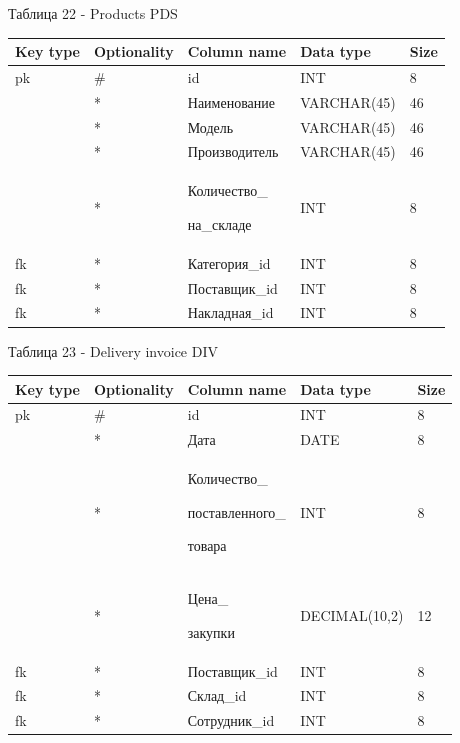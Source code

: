 \documentclass[14pt]{extreport}
\begin{document}
\newpage

\noindent
Таблица 22 - Products PDS
\begin{center}
\begin{longtable}{ |m{1.3cm}|m{2.7cm}|m{4.5cm}|m{3.5cm}|m{1.8cm}| } 
 \hline
 Key type & Optionality & Column name & Data type & Size \\ [0.5ex] 
 \hline\hline
 pk & \# & id & INT & 8 \\
 \hline
  & * & Наименование & VARCHAR(45) & 46 \\
 \hline
  & * & Модель & VARCHAR(45) & 46 \\
 \hline
  & * & Производитель & VARCHAR(45) & 46 \\
 \hline
  & * & Количество\_
 
 на\_складе & INT & 8 \\
 \hline
 fk & * & Категория\_id & INT & 8 \\
 \hline
 fk & * & Поставщик\_id & INT & 8 \\
 \hline
 fk & * & Накладная\_id & INT & 8 \\
 \hline
\end{longtable}
\end{center}


\noindent
Таблица 23 - Delivery invoice DIV
\begin{center}
\begin{longtable}{ |m{1.3cm}|m{2.7cm}|m{4.5cm}|m{3.5cm}|m{1.8cm}| } 
 \hline
 Key type & Optionality & Column name & Data type & Size \\ [0.5ex] 
 \hline\hline
 pk & \# & id & INT & 8 \\
 \hline
  & * & Дата & DATE & 8 \\
 \hline
  & * & Количество\_
  
 поставленного\_
  
 товара & INT & 8 \\
 \hline
  & * & Цена\_
  
 закупки & DECIMAL(10,2) & 12 \\
 \hline
 fk & * & Поставщик\_id & INT & 8 \\
 \hline
 fk & * & Склад\_id & INT & 8 \\
 \hline
 fk & * & Сотрудник\_id & INT & 8 \\
 \hline
\end{longtable}
\end{center}


\newpage
\end{document}
